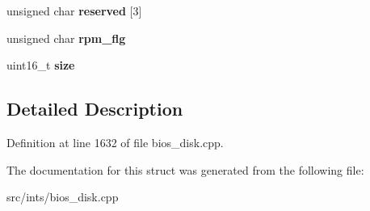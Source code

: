 \begin{DoxyCompactItemize}
\item 
\hypertarget{structD88SEC_ae71af3325f276f748b4966972fd3832c}{unsigned char {\bfseries reserved} \mbox{[}3\mbox{]}}\label{structD88SEC_ae71af3325f276f748b4966972fd3832c}

\item 
\hypertarget{structD88SEC_a2bfa52815aee40f7c5383a0a51175aa3}{unsigned char {\bfseries rpm\-\_\-flg}}\label{structD88SEC_a2bfa52815aee40f7c5383a0a51175aa3}

\item 
\hypertarget{structD88SEC_af830ea69e2aa174d018743dfbc12edce}{uint16\-\_\-t {\bfseries size}}\label{structD88SEC_af830ea69e2aa174d018743dfbc12edce}

\end{DoxyCompactItemize}


\subsection{Detailed Description}


Definition at line 1632 of file bios\-\_\-disk.\-cpp.



The documentation for this struct was generated from the following file\-:\begin{DoxyCompactItemize}
\item 
src/ints/bios\-\_\-disk.\-cpp\end{DoxyCompactItemize}
